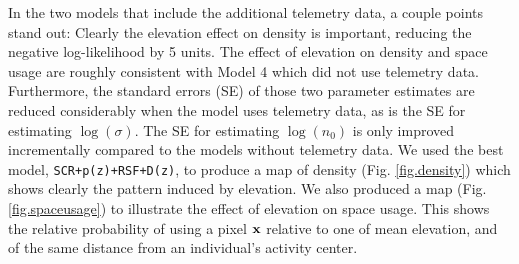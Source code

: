 \documentclass[12pt]{article}
\begin{document}
In the two models that include the additional telemetry data, a couple
points
stand out: Clearly the elevation effect on density is
important, reducing the negative log-likelihood by 5 units. The effect
of elevation on density and space usage are roughly consistent with
Model 4 which did not use telemetry data. Furthermore, the standard
errors (SE) of
those two parameter estimates are reduced considerably when the model
uses telemetry data,  as is the SE
for estimating $\log(\sigma)$.  The SE for estimating $\log(n_{0})$ is
only improved incrementally compared to the models without telemetry
data.
We used the best model, \mbox{\tt SCR+p(z)+RSF+D(z)}, to produce a map
of density (Fig. \ref{fig.density}) which shows clearly the
pattern induced by elevation. We also produced a map 
 (Fig. \ref{fig.spaceusage})
to illustrate the
effect of elevation on space usage. This shows the relative
probability of using a pixel ${\bf x}$ relative to one of mean
elevation, and of the same distance from an individual's activity center.
\end{document}
